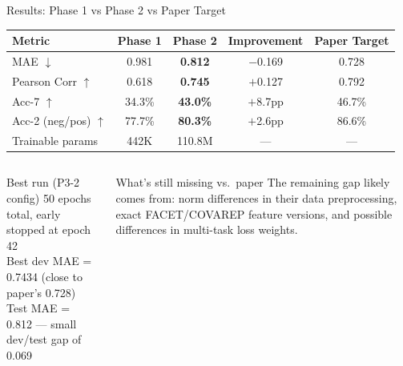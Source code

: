\documentclass[aspectratio=169]{beamer}
\begin{document}
\begin{frame}{Results: Phase 1 vs Phase 2 vs Paper Target}
  \vspace{-2pt}
  \begin{center}
  \renewcommand{\arraystretch}{1.4}
  \begin{tabular}{lcccc}
    \toprule
    \textbf{Metric} &
    \textbf{Phase 1} &
    \textbf{Phase 2} &
    \textbf{Improvement} &
    \textbf{Paper Target} \\
    \midrule
    MAE $\downarrow$     & 0.981 & \textbf{0.812} &
      \cellcolor{goodgreen!20}$-$0.169 & 0.728 \\
    Pearson Corr $\uparrow$ & 0.618 & \textbf{0.745} &
      \cellcolor{goodgreen!20}$+$0.127 & 0.792 \\
    Acc-7 $\uparrow$     & 34.3\% & \textbf{43.0\%} &
      \cellcolor{goodgreen!20}$+$8.7pp & 46.7\% \\
    Acc-2 (neg/pos) $\uparrow$ & 77.7\% & \textbf{80.3\%} &
      \cellcolor{goodgreen!20}$+$2.6pp & 86.6\% \\
    \midrule
    Trainable params & 442K & 110.8M & --- & --- \\
    \bottomrule
  \end{tabular}
  \end{center}

  \vspace{6pt}
  \begin{columns}[T]
      \begin{exampleblock}{Best run (P3-2 config)}
        \small
        50 epochs total, early stopped at epoch 42\\
        Best dev MAE = 0.7434 (close to paper's 0.728)\\
        Test MAE = 0.812 — small dev/test gap of 0.069
      \end{exampleblock}
      \begin{alertblock}{What's still missing vs.\ paper}
        \small
        The remaining gap likely comes from: norm differences
        in their data preprocessing, exact FACET/COVAREP feature
        versions, and possible differences in multi-task loss weights.
      \end{alertblock}
  \end{columns}
\end{frame}
\end{document}
